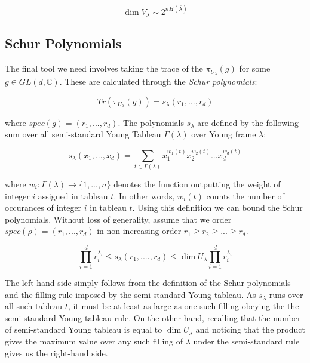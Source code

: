 \documentclass[12pt]{article}%
\begin{document}
\begin{equation} \label{asymp}
  \dim V_{\lambda} \sim 2^{nH(\bar{\lambda})}
\end{equation}

\subsection{Schur Polynomials}
The final tool we need involves taking the trace of the $\pi_{U_{\lambda}}(g)$ for some $g \in GL(d, \mathbb{C})$. These are calculated through the \textit{Schur polynomials}:

\begin{equation}\label{schurdef}
    Tr(\pi_{U_\lambda}(g)) = s_{\lambda}(r_1,...,r_d)
\end{equation}

\noindent where $spec(g) = (r_1,...,r_d)$. The polynomials $s_\lambda$ are defined by the following sum over all semi-standard Young Tableau $\Gamma(\lambda)$ over Young frame $\lambda$:

\begin{equation}
  s_{\lambda}(x_1,...,x_d) = \sum_{t \in \Gamma(\lambda)} x_1^{w_1(t)}x_2^{w_2(t)}...x_d^{w_d(t)}
\end{equation}

\noindent where $w_i: \Gamma(\lambda) \rightarrow \{1,...,n\}$ denotes the function outputting the weight of integer $i$ assigned in tableau $t$. In other words, $w_i(t)$ counts the number of occurances of integer $i$ in tableau $t$. Using this definition we can bound the Schur polynomials. Without loss of generality, assume that we order $spec(\rho) = (r_1,...,r_d)$ in non-increasing order $r_1 \geq r_2 \geq ... \geq r_d$.

\begin{equation} \label{schur}
  \prod_{i=1}^d r_i^{\lambda_i} \leq s_{\lambda}(r_1,....,r_d) \leq \dim{U_\lambda} \prod_{i=1}^d r_i^{\lambda_i}
\end{equation}

The left-hand side simply follows from the definition of the Schur polynomials and the filling rule imposed by the semi-standard Young tableau. As $s_\lambda$ runs over all such tableau $t$, it must be at least as large as one such filling obeying the the semi-standard Young tableau rule.
On the other hand, recalling that the number of semi-standard Young tableau is equal to $\dim U_{\lambda}$ and noticing that the product gives the maximum value over any such filling of $\lambda$ under the semi-standard rule gives us the right-hand side.
\end{document}
